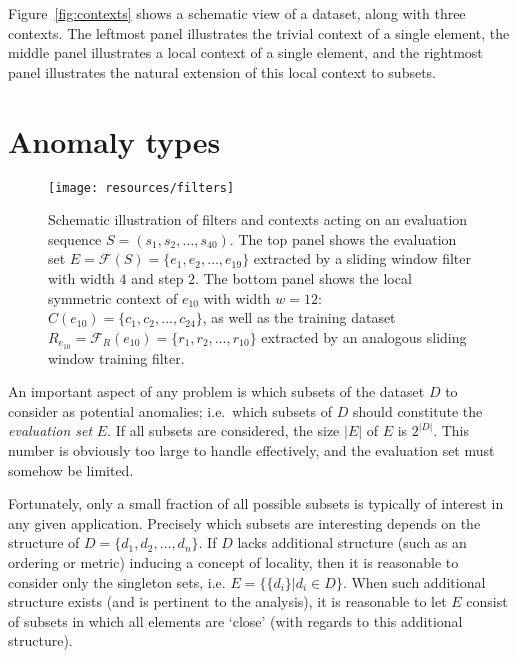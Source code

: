 Figure~\ref{fig:contexts} shows a schematic view of a dataset, along with three contexts. The leftmost panel illustrates the trivial context of a single element, the middle panel illustrates a local context of a single element, and the rightmost panel illustrates the natural extension of this local context to subsets.

\section{Anomaly types}
\label{sect:anomaly_types}

\begin{figure}[htb]
    \begin{center}
        \texttt{[image: resources/filters]}
    \end{center}
    \caption{{\small Schematic illustration of filters and contexts acting on an evaluation sequence $S = (s_1, s_2, \dots, s_{40})$. The top panel shows the evaluation set $E = \mathcal{F}(S) = \{e_1, e_2, \dots, e_{19}\}$ extracted by a sliding window filter with width $4$ and step $2$. The bottom panel shows the local symmetric context of $e_{10}$ with width $w = 12$: $C(e_{10}) = \{c_1, c_2, \dots, c_{24}\}$, as well as the training dataset $R_{e_{10}} = \mathcal{F}_R(e_{10}) = \{r_1, r_2, \dots, r_{10}\}$ extracted by an analogous sliding window training filter.}}
\label{fig:filters}
\end{figure}

An important aspect of any problem is which subsets of the dataset $D$ to consider as potential anomalies; i.e.\ which subsets of $D$ should constitute the \emph{evaluation set} $E$. If all subsets are considered, the size $|E|$ of $E$ is $2^{|D|}$. This number is obviously too large to handle effectively, and the evaluation set must somehow be limited.

Fortunately, only a small fraction of all possible subsets is typically of interest in any given application. Precisely which subsets are interesting depends on the structure of $D = \{d_1, d_2, \dots, d_n\}$. If $D$ lacks additional structure (such as an ordering or metric) inducing a concept of locality, then it is reasonable to consider only the singleton sets, i.e. $E = \{\{d_i\} | d_i \in D\}$. When such additional structure exists (and is pertinent to the analysis), it is reasonable to let $E$ consist of subsets in which all elements are `close' (with regards to this additional structure).

